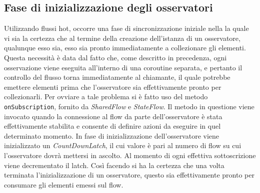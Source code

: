 \documentclass[12pt,a4paper,openright,twoside]{book}
\begin{document}
\subsection{Fase di inizializzazione degli osservatori}
Utilizzando flussi hot, occorre una fase di sincronizzazione iniziale nella la quale vi sia la certezza che al termine della creazione dell'istanza di un osservatore, qualunque esso sia, esso sia pronto immediatamente a collezionare gli elementi.
Questa necessità è data dal fatto che, come descritto in precedenza, ogni osservazione viene eseguita all'interno di una coroutine separata, e pertanto il controllo del flusso torna immediatamente al chiamante, il quale potrebbe emettere elementi prima che l'osservatore sia effettivamente pronto per collezionarli. 
Per ovviare a tale problema si è fatto uso del metodo \texttt{onSubscription}, fornito da \textit{SharedFlow} e \textit{StateFlow}. Il metodo in questione viene invocato quando la connessione al flow da parte dell'osservatore è stata effettivamente stabilita e consente di definire azioni da eseguire in quel determinato momento.
In fase di inizializzazione dell'osservatore viene inizializzato un \textit{CountDownLatch}, il cui valore è pari al numero di flow su cui l'osservatore dovrà mettersi in ascolto. 
Al momento di ogni effettiva sottoscrizione viene decrementato il latch. 
Così facendo si ha la certezza che una volta terminata l'inizializzazione di un osservatore, questo sia effettivamente pronto per consumare gli elementi emessi sul flow. 
\end{document}
